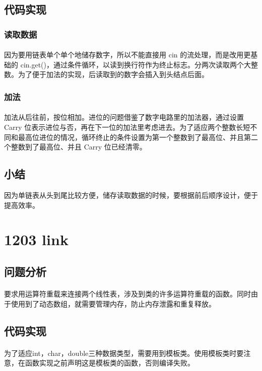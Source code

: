 \documentclass[UTF-8, 12pt]{ctexart}
\begin{document}
    \subsection{代码实现}
        \subsubsection{读取数据}
        \paragraph{}
    因为要用链表单个单个地储存数字，所以不能直接用 cin 的流处理，而是改用更基础的 cin.get()，通过条件循环，以读到换行符作为终止标志。分两次读取两个大整数。为了便于加法的实现，后读取到的数字会插入到头结点后面。
        \subsubsection{加法}
        \paragraph{}
    加法从后往前，按位相加。进位的问题借鉴了数字电路里的加法器，通过设置 Carry 位表示进位与否，再在下一位的加法里考虑进去。为了适应两个整数长短不同和最高位进位的情况，循环终止的条件设置为第一个整数到了最高位、并且第二个整数到了最高位、并且 Carry 位已经清零。
    \subsection{小结}
    因为单链表从头到尾比较方便，储存读取数据的时候，要根据前后顺序设计，便于提高效率。

\section{1203 link}
    \subsection{问题分析}
    \paragraph{}
    要求用运算符重载来连接两个线性表，涉及到类的许多运算符重载的函数。同时由于使用到了动态数组，就需要管理内存，防止内存泄露和重复释放。
    \subsection{代码实现}
    \paragraph{}
    为了适应int，char，double三种数据类型，需要用到模板类。使用模板类时要注意，在函数实现之前声明这是模板类的函数，否则编译失败。
\end{document}
